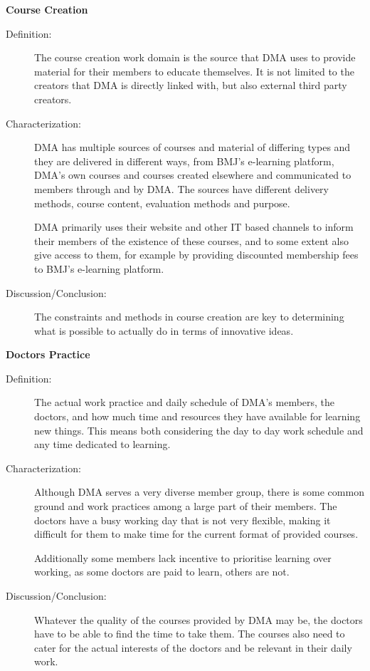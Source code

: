 \textbf{Course Creation}
\begin{description}
\item[Definition:] The course creation work domain is the source that DMA uses to provide material for their members to educate themselves. It is not limited to the creators that DMA is directly linked with, but also external third party creators.

\item[Characterization:] DMA has multiple sources of courses and material of differing types and they are delivered in different ways, from BMJ’s e-learning platform, DMA’s own courses and courses created elsewhere and communicated to members through and by DMA.
The sources have different delivery methods, course content, evaluation methods and purpose.

DMA primarily uses their website and other IT based channels to inform their members of the existence of these courses, and to some extent also give access to them, for example by providing discounted membership fees to BMJ’s e-learning platform.
\item[Discussion/Conclusion:] The constraints and methods in course creation are key to determining what is possible to actually do in terms of innovative ideas.

\end{description}

\textbf{Doctors Practice}
\begin{description}
\item[Definition:] The actual work practice and daily schedule of DMA’s members, the doctors, and how much time and resources they have available for learning new things. This means both considering the day to day work schedule and any time dedicated to learning.

\item[Characterization:] Although DMA serves a very diverse member group, there is some common ground and work practices among a large part of their members. The doctors have a busy working day that is not very flexible, making it difficult for them to make time for the current format of provided courses.

Additionally some members lack incentive to prioritise learning over working, as some doctors are paid to learn, others are not.

\item[Discussion/Conclusion:] Whatever the quality of the courses provided by DMA may be, the doctors have to be able to find the time to take them. The courses also need to cater for the actual interests of the doctors and be relevant in their daily work.


\end{description}



